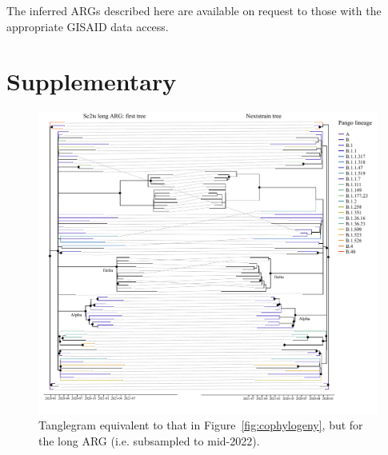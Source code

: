 \documentclass{article}
\begin{document}
The inferred ARGs described here are available on request to those with
the appropriate GISAID data access.




\renewcommand\thefigure{S\arabic{figure}}
\setcounter{figure}{0}
\renewcommand\thetable{S\arabic{table}}
\setcounter{table}{0}
\section*{Supplementary}

\begin{figure} \centering
\includegraphics[width=\textwidth]{figures/supp_cophylogeny_long.pdf}
\caption{\label{fig:cophylogeny_long}Tanglegram equivalent to that in Figure~\ref{fig:cophylogeny}, but for the long ARG (i.e. subsampled to mid-2022). }
\end{figure}
\end{document}
